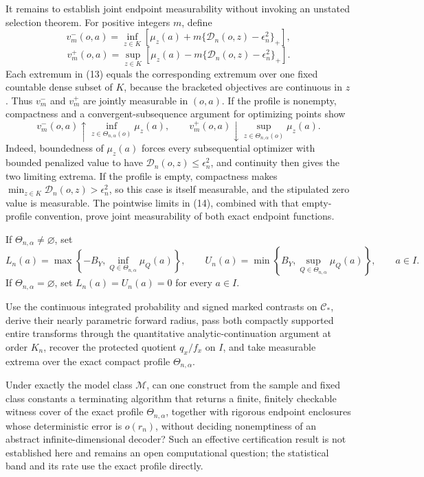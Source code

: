 It remains to establish joint endpoint measurability without invoking an unstated selection theorem.  For positive integers \(m\), define
\[
v_m^-(o,a)=\inf_{z\in K}\left[\mu_z(a)+m\{\mathscr D_n(o,z)-\epsilon_n^2\}_+\right],
\]
\[
v_m^+(o,a)=\sup_{z\in K}\left[\mu_z(a)-m\{\mathscr D_n(o,z)-\epsilon_n^2\}_+\right]. \tag{13}
\]
Each extremum in (13) equals the corresponding extremum over one fixed countable dense subset of \(K\), because the bracketed objectives are continuous in \(z\).  Thus \(v_m^-\) and \(v_m^+\) are jointly measurable in \((o,a)\).  If the profile is nonempty, compactness and a convergent-subsequence argument for optimizing points show
\[
v_m^-(o,a)\uparrow\inf_{z\in\Theta_{n,\alpha}(o)}\mu_z(a),
\qquad
v_m^+(o,a)\downarrow\sup_{z\in\Theta_{n,\alpha}(o)}\mu_z(a). \tag{14}
\]
Indeed, boundedness of \(\mu_z(a)\) forces every subsequential optimizer with bounded penalized value to have \(\mathscr D_n(o,z)\le\epsilon_n^2\), and continuity then gives the two limiting extrema.  If the profile is empty, compactness makes \(\min_{z\in K}\mathscr D_n(o,z)>\epsilon_n^2\), so this case is itself measurable, and the stipulated zero value is measurable.  The pointwise limits in (14), combined with that empty-profile convention, prove joint measurability of both exact endpoint functions.

If \(\Theta_{n,\alpha}\neq\varnothing\), set
\[
L_n(a)=\max\left\{-B_Y,\inf_{Q\in\Theta_{n,\alpha}}\mu_Q(a)\right\},
\qquad
U_n(a)=\min\left\{B_Y,\sup_{Q\in\Theta_{n,\alpha}}\mu_Q(a)\right\},
\qquad a\in I.
\]
If \(\Theta_{n,\alpha}=\varnothing\), set \(L_n(a)=U_n(a)=0\) for every \(a\in I\).

Use the continuous integrated probability and signed marked contrasts on \(\mathcal C_*\), derive their nearly parametric forward radius, pass both compactly supported entire transforms through the quantitative analytic-continuation argument at order \(K_n\), recover the protected quotient \(q_x/f_x\) on \(I\), and take measurable extrema over the exact compact profile \(\Theta_{n,\alpha}\).

Under exactly the model class \(\mathcal M\), can one construct from the sample and fixed class constants a terminating algorithm that returns a finite, finitely checkable witness cover of the exact profile \(\Theta_{n,\alpha}\), together with rigorous endpoint enclosures whose deterministic error is \(o(r_n)\), without deciding nonemptiness of an abstract infinite-dimensional decoder?  Such an effective certification result is not established here and remains an open computational question; the statistical band and its rate use the exact profile directly.

